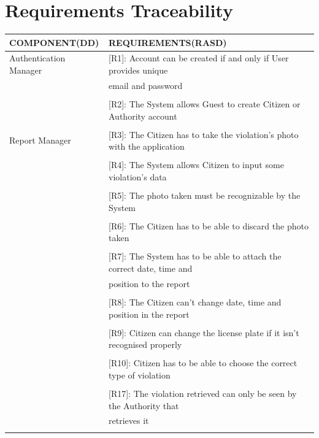 \documentclass{article}
\begin{document}
\section{Requirements Traceability}
\begin{center}
    \begin{tabular}{ | l | l |}
        \hline
        COMPONENT(DD) & REQUIREMENTS(RASD) \\
        \hline
        Authentication Manager & [R1]: Account can be created if and only if User provides unique \\ 
                               & email and password \\\\
                               & [R2]: The System allows Guest to create Citizen or Authority account \\\\
        \hline
        Report Manager  & [R3]: The Citizen has to take the violation’s photo with the application \\\\
                        & [R4]: The System allows Citizen to input some violation’s data \\\\
                        & [R5]: The photo taken must be recognizable by the System \\\\
                        & [R6]: The Citizen has to be able to discard the photo taken \\\\
                        & [R7]: The System has to be able to attach the correct date, time and \\ 
                        & position to the report \\\\
                        & [R8]: The Citizen can’t change date, time and position in the report \\\\ 
                        & [R9]: Citizen can change the license plate if it isn’t recognised properly \\\\
                        & [R10]: Citizen has to be able to choose the correct type of violation \\\\
                        & [R17]: The violation retrieved can only be seen by the Authority that \\
                        & retrieves it \\\\

\end{tabular}
\end{center}
\end{document}
